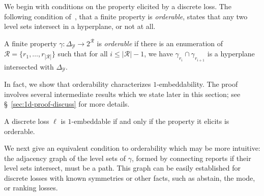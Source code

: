 \documentclass[anon]{colt2020} %
\newcommand{\simplex}{\Delta_\Y}
\newcommand{\R}{\mathcal{R}}
\newcommand{\Y}{\mathcal{Y}}
\begin{document}
We begin with conditions on the property elicited by a discrete loss.
The following condition of~\citet[Theorem 3]{lambert2018elicitation}, that a finite property is \emph{orderable}, states that any two level sets intersect in a hyperplane, or not at all.
\begin{definition}[Orderable]\label{def:orderable-hyperplane}
	A finite property $\gamma:\simplex \to 2^\R$ is \emph{orderable} if there is an enumeration of $\R = \{r_1, \ldots, r_{|\R|}\}$ such that for all $i \leq |\R| - 1$, we have $\gamma_{r_i} \cap \gamma_{r_{i+1}}$ is a hyperplane intersected with $\simplex$.
\end{definition}

In fact, we show that orderability characterizes $1$-embeddability.
The proof involves several intermediate results which we state later in this section; see \S~\ref{sec:1d-proof-discuss} for more details. 
\begin{theorem} \label{thm:orderable-iff-1d}
  A discrete loss $\ell$ is $1$-embeddable if and only if the property it elicits is orderable.
\end{theorem}

We next give an equivalent condition to orderability which may be more intuitive: the adjacency graph of the level sets of $\gamma$, formed by connecting reports if their level sets intersect, must be a path.
This graph can be easily established for discrete losses with known symmetries or other facts, such as abstain, the mode, or ranking losses.
\end{document}
